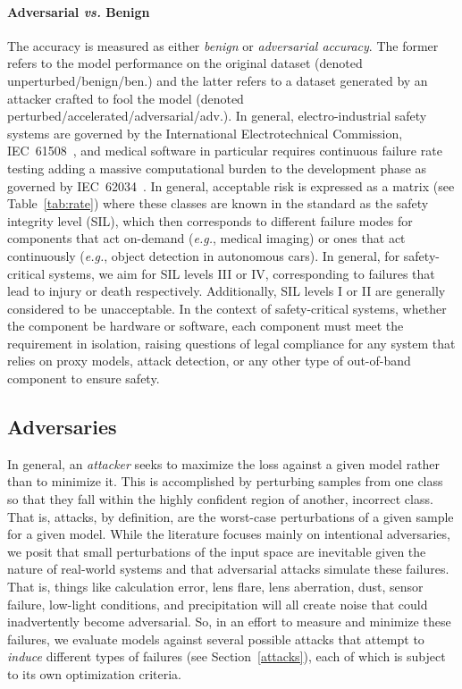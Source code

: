 \documentclass[journal]{IEEEtran}
\newcommand{\eg}{\textit{e.g.}\xspace}
\begin{document}
\paragraph{Adversarial \textit{vs.} Benign}

The accuracy is measured as either \textit{benign} or \textit{adversarial accuracy}. The former refers to the model performance on the original dataset (denoted unperturbed/benign/ben.) and the latter refers to a dataset generated by an attacker crafted to fool the model (denoted perturbed/accelerated/adversarial/adv.). 
In general, electro-industrial safety systems are governed by the International Electrotechnical Commission, IEC~61508~\cite{IEC61508}, and medical software in particular requires continuous failure rate testing adding a massive computational burden to the development phase as governed by IEC~62034~\cite{IEC62034}. In general, acceptable risk is expressed as a matrix (see Table~\ref{tab:rate}) where these classes are known in the standard as the safety integrity level (SIL), which then corresponds to different failure modes for components that act on-demand (\eg, medical imaging) or ones that act continuously (\eg, object detection in autonomous cars). In general, for safety-critical systems, we aim for SIL levels III or IV, corresponding to failures that lead to injury or death respectively. Additionally, SIL levels I or II are generally considered to be unacceptable. In the context of safety-critical systems, whether the component be hardware or software, each component must meet the requirement in isolation, raising questions of legal compliance for any system that relies on proxy models, attack detection, or any other type of out-of-band component to ensure safety.


\subsection{Adversaries}

In general, an \textit{attacker} seeks to maximize the loss against a given model rather than to minimize it. This is accomplished by perturbing samples from one class so that they fall within the highly confident region of another, incorrect class. That is, attacks, by definition, are the worst-case perturbations of a given sample for a given model. While the literature focuses mainly on intentional adversaries, we posit that small perturbations of the input space are inevitable given the nature of real-world systems and that adversarial attacks simulate these failures. That is, things like calculation error, lens flare, lens aberration, dust, sensor failure, low-light conditions, and precipitation will all create noise that could inadvertently become adversarial. So, in an effort to measure and minimize these failures, we evaluate models against several possible attacks that attempt to \textit{induce} different types of failures (see Section~\ref{attacks}), each of which is subject to its own optimization criteria.
\end{document}
